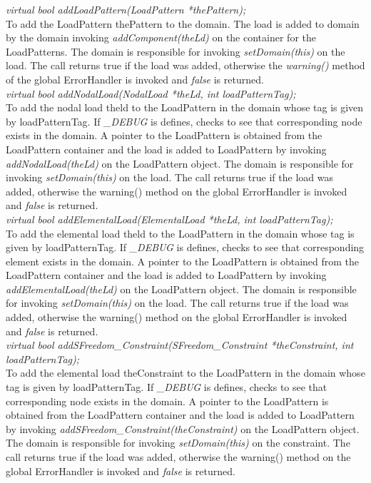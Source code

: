 {{\em virtual bool addLoadPattern(LoadPattern *thePattern);}  \\ 
To add the LoadPattern \p thePattern to the domain.
The load is added to domain by the domain invoking {\em
addComponent(theLd)} on the container for the LoadPatterns. The domain
is responsible for invoking {\em setDomain(this)} on the load. The
call returns \p true if the load was added, otherwise the {\em
warning()} method of the global ErrorHandler is invoked and {\em
false} is returned.\\ 

{\em virtual bool addNodalLoad(NodalLoad *theLd, int loadPatternTag);}  \\ 
To add the nodal load \p theld to the LoadPattern in the domain
whose tag is given by \p loadPatternTag.
If {\em \_DEBUG} is defines, checks to see that corresponding node
exists in the domain. A pointer to the LoadPattern is obtained from
the LoadPattern container and the load is added to LoadPattern by
invoking {\em addNodalLoad(theLd)} on the LoadPattern object. The
domain is responsible for invoking {\em setDomain(this)} on the
load. The call returns \p true if the load was added, otherwise the
warning() method on the global ErrorHandler is invoked and {\em
false} is returned.\\ 


{\em virtual bool addElementalLoad(ElementalLoad *theLd, int loadPatternTag);}  \\ 
To add the elemental load \p theld to the LoadPattern in the domain
whose tag is given by \p loadPatternTag.
If {\em \_DEBUG} is defines, checks to see that corresponding element
exists in the domain. A pointer to the LoadPattern is obtained from
the LoadPattern container and the load is added to LoadPattern by
invoking {\em addElementalLoad(theLd)} on the LoadPattern object. The
domain is responsible for invoking {\em setDomain(this)} on the
load. The call returns \p true if the load was added, otherwise the
warning() method on the global ErrorHandler is invoked and {\em
false} is returned.\\ 


{\em virtual bool addSFreedom\_Constraint(SFreedom\_Constraint *theConstraint, int
loadPatternTag);}  \\  
To add the elemental load \p theConstraint to the LoadPattern in the domain
whose tag is given by \p loadPatternTag.
If {\em \_DEBUG} is defines, checks to see that corresponding node
exists in the domain. A pointer to the LoadPattern is obtained from
the LoadPattern container and the load is added to LoadPattern by
invoking {\em addSFreedom\_Constraint(theConstraint)} on the LoadPattern object. The
domain is responsible for invoking {\em setDomain(this)} on the
constraint. The call returns \p true if the load was added, otherwise the
warning() method on the global ErrorHandler is invoked and {\em
false} is returned.\\ 


}
